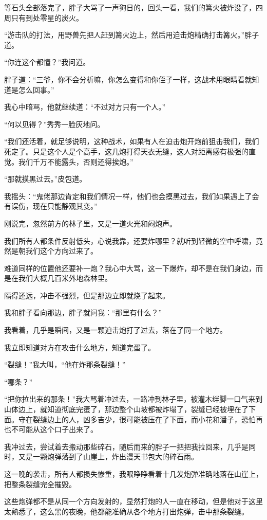 等石头全部落完了，胖子大骂了一声狗日的，回头一看，我们的篝火被炸没了，四周只有到处零星的炭火。

“游击队的打法，用野兽先把人赶到篝火边上，然后用迫击炮精确打击篝火。”胖子道。

“你连这个都懂？”我问道。

胖子道：“三爷，你不会分析嘛，你怎么变得和你侄子一样，这战术用眼睛看就知道是怎么回事。”

我心中暗骂，他就继续道：“不过对方只有一个人。”

“何以见得？”秀秀一脸灰地问。

“我们还活着，就足够说明，这种战术，如果有人在迫击炮开炮前狙击我们，我们死定了。只是这个人是个高手，这几炮打得天衣无缝，这人对距离感有极强的直觉。我们千万不能露头，否则还得挨炮。”

“那就摸黑过去。”皮包道。

我摇头：“鬼佬那边肯定和我们情况一样，他们也会摸黑过去，我们如果遇上了会有误伤，现在只能静观其变。”

刚说完，忽然前方的林子里，又是一道火光和闷炮声。

我们所有人都条件反射低头，心说我靠，还要炸哪里？就听到轻微的空中呼啸，竟然是朝我们这个方向过来了。

难道同样的位置他还要补一炮？我心中大骂，这一下爆炸，却不是在我们身边，而是在我们大概几百米外地森林里。

隔得还远，冲击不强烈，但是那边立即就烧了起来。

我和胖子看向那边，胖子就问我：“那里有什么？”

我看着，几乎是瞬间，又是一颗迫击炮打了过去，落在了同一个地方。

我立即知道对方在攻击什么地方，知道完蛋了。

“裂缝！”我大叫，“他在炸那条裂缝！”

“哪条？”

“把你拉出来的那条！”我大骂着冲过去，一路冲到林子里，被灌木绊脚一口气来到山体边上，就知道彻底完蛋了，那边整个山坡都被炸塌了，裂缝已经被埋在了下面。守在裂缝边上的人，凶多吉少，很可能被压在了下面，而小花和潘子，恐怕再也不可能从这个口子出来了。

我冲过去，尝试着去搬动那些碎石，随后而来的胖子一把把我拉回来，几乎是同时，又是一颗炮弹落到了山崖上，炸出漫天书包大的碎石雨。

这一晚的袭击，所有人都损失惨重，我眼睁睁看着十几发炮弹准确地落在山崖上，把整条裂缝完全摧毁。

这些炮弹都不是从同一个方向发射的，显然打炮的人一直在移动，但是他对于这里太熟悉了，这么黑的夜晚，他都能准确从各个地方打出炮弹，击中那条裂缝。

